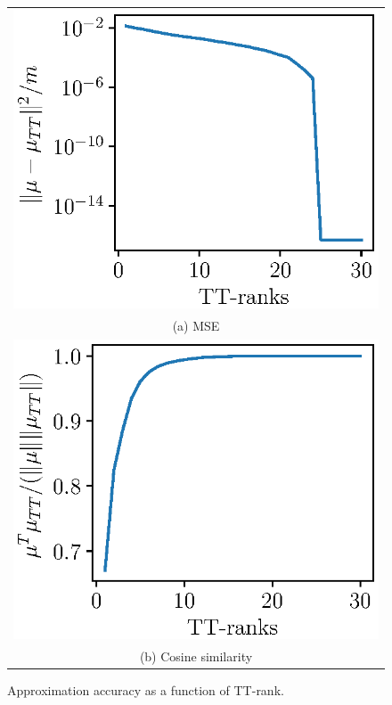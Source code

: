 \begin{figure}[!h]
  \vspace{-.3cm}
  \begin{center}
      \begin{tabular}{c}
          \includegraphics[width=0.95\linewidth]{pics/acc_vs_ranks.eps} \\
          (a) MSE\\  
          \includegraphics[width=0.95\linewidth]{pics/cos_vs_ranks.eps} \\
          (b) Cosine similarity
      \end{tabular}
  \end{center}
  \caption{Approximation accuracy as a function of TT-rank.}
  \label{acc_vs_ranks}
\end{figure}

